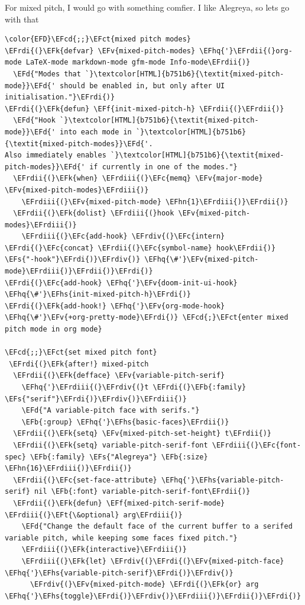 \documentclass{scrartcl}
\newcommand{\EFk}[1]{\textcolor{EFk}{#1}} %
\newcommand{\EFd}[1]{\textcolor{EFd}{\textit{#1}}} %
\newcommand{\EFt}[1]{\textcolor{EFt}{#1}} %
\newcommand{\EFs}[1]{\textcolor{EFs}{#1}} %
\newcommand{\EFb}[1]{\textcolor{EFb}{#1}} %
\newcommand{\EFct}[1]{\textcolor{EFct}{#1}} %
\newcommand{\EFc}[1]{\textcolor{EFc}{#1}} %
\newcommand{\EFv}[1]{\textcolor{EFv}{#1}} %
\newcommand{\EFf}[1]{\textcolor{EFf}{#1}} %
\newcommand{\EFcd}[1]{\textcolor{EFcd}{#1}} %
\newcommand{\EFhn}[1]{\textcolor{EFhn}{\textbf{#1}}} %
\newcommand{\EFhq}[1]{\textcolor{EFhq}{#1}} %
\newcommand{\EFhs}[1]{\textcolor{EFhs}{#1}} %
\newcommand{\EFrdi}[1]{\textcolor{EFrdi}{#1}} %
\newcommand{\EFrdii}[1]{\textcolor{EFrdii}{#1}} %
\newcommand{\EFrdiii}[1]{\textcolor{EFrdiii}{#1}} %
\newcommand{\EFrdiv}[1]{\textcolor{EFrdiv}{#1}} %
\begin{document}
For mixed pitch, I would go with something comfier. I like Alegreya, so lets go with that
\begin{Code}
\begin{Verbatim}[]
\color{EFD}\EFcd{;;}\EFct{mixed pitch modes}
\EFrdi{(}\EFk{defvar} \EFv{mixed-pitch-modes} \EFhq{'}\EFrdii{(}org-mode LaTeX-mode markdown-mode gfm-mode Info-mode\EFrdii{)}
  \EFd{"Modes that `}\textcolor[HTML]{b751b6}{\textit{mixed-pitch-mode}}\EFd{' should be enabled in, but only after UI initialisation."}\EFrdi{)}
\EFrdi{(}\EFk{defun} \EFf{init-mixed-pitch-h} \EFrdii{(}\EFrdii{)}
  \EFd{"Hook `}\textcolor[HTML]{b751b6}{\textit{mixed-pitch-mode}}\EFd{' into each mode in `}\textcolor[HTML]{b751b6}{\textit{mixed-pitch-modes}}\EFd{'.
Also immediately enables `}\textcolor[HTML]{b751b6}{\textit{mixed-pitch-modes}}\EFd{' if currently in one of the modes."}
  \EFrdii{(}\EFk{when} \EFrdiii{(}\EFc{memq} \EFv{major-mode} \EFv{mixed-pitch-modes}\EFrdiii{)}
    \EFrdiii{(}\EFv{mixed-pitch-mode} \EFhn{1}\EFrdiii{)}\EFrdii{)}
  \EFrdii{(}\EFk{dolist} \EFrdiii{(}hook \EFv{mixed-pitch-modes}\EFrdiii{)}
    \EFrdiii{(}\EFc{add-hook} \EFrdiv{(}\EFc{intern} \EFrdi{(}\EFc{concat} \EFrdii{(}\EFc{symbol-name} hook\EFrdii{)} \EFs{"-hook"}\EFrdi{)}\EFrdiv{)} \EFhq{\#'}\EFv{mixed-pitch-mode}\EFrdiii{)}\EFrdii{)}\EFrdi{)}
\EFrdi{(}\EFc{add-hook} \EFhq{'}\EFv{doom-init-ui-hook} \EFhq{\#'}\EFhs{init-mixed-pitch-h}\EFrdi{)}
\EFrdi{(}\EFk{add-hook!} \EFhq{'}\EFv{org-mode-hook} \EFhq{\#'}\EFv{+org-pretty-mode}\EFrdi{)} \EFcd{;}\EFct{enter mixed pitch mode in org mode}

\EFcd{;;}\EFct{set mixed pitch font}
 \EFrdi{(}\EFk{after!} mixed-pitch
  \EFrdii{(}\EFk{defface} \EFv{variable-pitch-serif}
    \EFhq{'}\EFrdiii{(}\EFrdiv{(}t \EFrdi{(}\EFb{:family} \EFs{"serif"}\EFrdi{)}\EFrdiv{)}\EFrdiii{)}
    \EFd{"A variable-pitch face with serifs."}
    \EFb{:group} \EFhq{'}\EFhs{basic-faces}\EFrdii{)}
  \EFrdii{(}\EFk{setq} \EFv{mixed-pitch-set-height} t\EFrdii{)}
  \EFrdii{(}\EFk{setq} variable-pitch-serif-font \EFrdiii{(}\EFc{font-spec} \EFb{:family} \EFs{"Alegreya"} \EFb{:size} \EFhn{16}\EFrdiii{)}\EFrdii{)}
  \EFrdii{(}\EFc{set-face-attribute} \EFhq{'}\EFhs{variable-pitch-serif} nil \EFb{:font} variable-pitch-serif-font\EFrdii{)}
  \EFrdii{(}\EFk{defun} \EFf{mixed-pitch-serif-mode} \EFrdiii{(}\EFt{\&optional} arg\EFrdiii{)}
    \EFd{"Change the default face of the current buffer to a serifed variable pitch, while keeping some faces fixed pitch."}
    \EFrdiii{(}\EFk{interactive}\EFrdiii{)}
    \EFrdiii{(}\EFk{let} \EFrdiv{(}\EFrdi{(}\EFv{mixed-pitch-face} \EFhq{'}\EFhs{variable-pitch-serif}\EFrdi{)}\EFrdiv{)}
      \EFrdiv{(}\EFv{mixed-pitch-mode} \EFrdi{(}\EFk{or} arg \EFhq{'}\EFhs{toggle}\EFrdi{)}\EFrdiv{)}\EFrdiii{)}\EFrdii{)}\EFrdi{)}
\end{Verbatim}
\end{Code}
\end{document}
